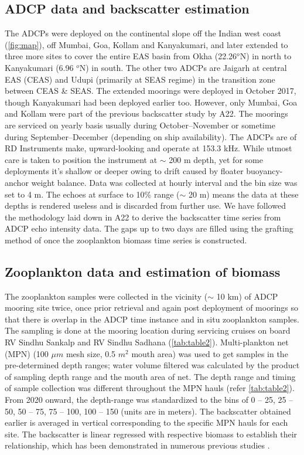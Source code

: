 \documentclass{article}
\begin{document}
	\subsection{ADCP data and backscatter estimation}
    The ADCPs were deployed on the continental slope off the Indian west coast (\cref{fig:map}), off Mumbai, Goa, Kollam and Kanyakumari, and later extended to three more sites to cover the entire EAS basin from Okha (22.26$^o$N) in north to Kanyakumari (6.96 $^o$N) in south. The other two ADCPs are  Jaigarh at central EAS (CEAS) and Udupi (primarily at SEAS regime) in the transition zone between CEAS \& SEAS. The extended moorings were deployed in October 2017, though Kanyakumari had been deployed earlier too. However, only Mumbai, Goa and Kollam were part of the previous backscatter study by A22. The moorings are serviced on yearly basis usually during October--November or sometime during September--December (depending on ship availability). The ADCPs are of RD Instruments make, upward-looking and operate at 153.3 kHz. While utmost care is taken to position the instrument at  $\sim$ 200 m depth, yet for some deployments it's shallow or deeper owing to drift caused by floater buoyancy-anchor weight balance. Data was collected at hourly interval and the bin size was set to 4 m. The echoes at surface to 10\% range ($\sim$ 20 m) means the data at these depths is rendered useless and is discarded from further use.  We have followed the methodology laid down in A22 to derive the backscatter time series from ADCP echo intensity data. The gaps up to two days are filled using the grafting method of \citet{mukhopadhyay2017st} once the zooplankton biomass time series is constructed.
    
	\subsection{Zooplankton data and estimation of biomass}
	The zooplankton  samples were collected in the vicinity ($\sim$ 10 km) of ADCP mooring site twice, once prior retrieval and again post deployment of moorings so that there is overlap in the ADCP time instance and in situ zooplankton samples. The sampling is done at the mooring location during servicing cruises on board RV Sindhu Sankalp and RV Sindhu Sadhana (\cref{tab:table2}). Multi-plankton net (MPN) (100 $\mu m$ mesh size, 0.5 $m^2$ mouth area) was used to get samples in the pre-determined depth ranges; water volume filtered was calculated by the product of sampling depth range and the mouth area of net. The depth range and timing of sample collection was different throughout the MPN hauls (refer \autoref{tab:table2}). From 2020 onward, the depth-range was standardized to the bins of 0 -- 25, 25 -- 50, 50 -- 75, 75 -- 100, 100 -- 150 (units are in meters). The backscatter obtained earlier is averaged in vertical corresponding to the specific MPN hauls for each site. The backscatter is linear regressed with respective biomass to establish their relationship, which has been demonstrated in numerous previous studies \citep{flagg1989use,heywood1991estimation,jiang2007temporal,aparna2022seasonal}.
	
\end{document}
